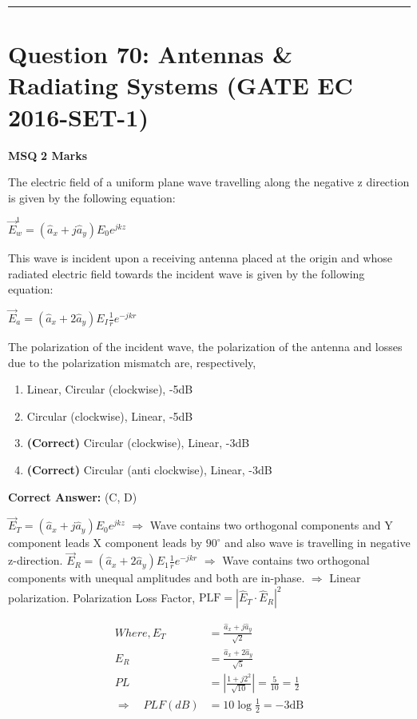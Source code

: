 \documentclass[11pt,a4paper]{article}
\begin{document}
\vspace{1.5em}
\hrule
\vspace{1.5em}

\section*{Question 70: Antennas \& Radiating Systems (GATE EC 2016-SET-1)}
\noindent \textbf{\color{primary}MSQ} \hfill \textbf{\color{secondary}2 Marks}


\noindent The electric field of a uniform plane wave travelling along the negative z direction is given by the following equation: 

$\vec{E}^{1}_{w}=(\hat{a}_{x}+j\hat{a}_{y})E_{0}e^{jkz}$ 

This wave is incident upon a receiving antenna placed at the origin and whose radiated electric field towards the incident wave is given by the following equation:  

$\vec{E}_{a}=(\hat{a}_{x}+2\hat{a}_{y})E_{I}\frac{1}{r}e^{-jkr}$    

The polarization of the incident wave, the polarization of the antenna and losses due to the polarization mismatch are, respectively,


\begin{enumerate}[label=(\Alph*)]
    \item Linear, Circular (clockwise), -5dB
    \item Circular (clockwise), Linear, -5dB
    \item \textbf{(Correct)} Circular (clockwise), Linear, -3dB
    \item \textbf{(Correct)} Circular (anti clockwise), Linear, -3dB
\end{enumerate}

\noindent \textbf{Correct Answer:} (C, D)

\begin{tcolorbox}[solbox, title=Detailed Solution -- Question 70]
$\vec{E}_{T}=\left(\hat{a}_{x}+j \hat{a}_{y}\right) E_{0} e^{j k z}$
$\Rightarrow$ Wave contains two orthogonal components and  Y component leads X component leads by $90^{\circ}$ and also wave is travelling in negative z-direction. 
$\vec{E}_{R}=\left(\hat{a}_{x}+2 \hat{a}_{y}\right) E_{1} \frac{1}{r} e^{-j k r}$
$\Rightarrow$ Wave contains two orthogonal components  with unequal amplitudes and both are in-phase.
$\Rightarrow$ Linear polarization.
 Polarization Loss Factor, $\mathrm{PLF}=\left|\hat{E}_{T} \cdot \hat{E}_{R}\right|^{2}$

\[
\begin{aligned} Where, E_{T}&=\frac{\hat{a}_{x}+j \hat{a}_{y}}{\sqrt{2}} \\ E_{R}&=\frac{\hat{a}_{x}+2 \hat{a}_{y}}{\sqrt{5}} \\ P L&= \left|\frac{1+j 2^{2}}{\sqrt{10} }\right|=\frac{5}{10}=\frac{1}{2} \\ \Rightarrow \quad P L F(d B)&=10 \log \frac{1}{2}=-3 \mathrm{dB} \end{aligned}
\]
\end{tcolorbox}
\end{document}
